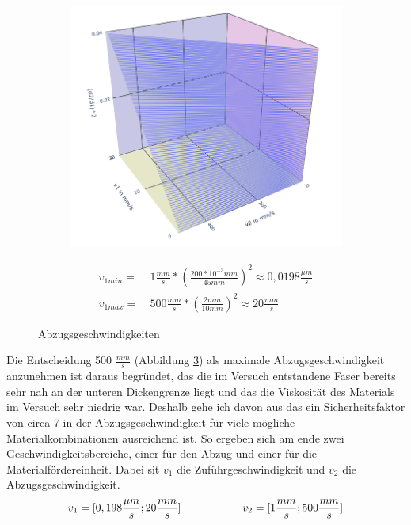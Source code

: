 \begin{figure}[!h]
     \centering
     \begin{subfigure}[]{0.4\textwidth}
         \centering
         \includegraphics[width=\textwidth]{Abbildungen/v1_v2_d_wirframe_2 (2).png}
         
         \label{fig:abzug_speed}
     \end{subfigure}
     \hspace{0mm}
     \begin{subfigure}[]{0.2\textwidth}
         \begin{align*}
             v_{1min} = &  \ 1 \frac{mm}{s} * (\frac{200*10^{-3}mm}{45mm})^2 \approx 0,0198 \frac{\mu m}{s}\\      
             v_{1max} = &  \ 500  \frac{mm}{s} * (\frac{2mm}{10mm})^2 \approx 20 \frac{mm}{s}
         \end{align*}
         
         \label{fig:abzug_min_max}
     \end{subfigure}
     \caption{Abzugsgeschwindigkeiten}
      \label{fig:abzugsgeschwindigkeit}
\end{figure}

Die Entscheidung 500 $\frac{mm}{s}$ (Abbildung \ref{fig:abzugsgeschwindigkeit}) als maximale Abzugsgeschwindigkeit anzunehmen ist daraus begründet, das die im Versuch entstandene Faser bereits sehr nah an der unteren Dickengrenze liegt und das die Viskosität des Materials im Versuch sehr niedrig war. Deshalb gehe ich davon aus das ein Sicherheitsfaktor von circa 7 in der Abzugsgeschwindigkeit für viele mögliche Materialkombinationen ausreichend ist. 
So ergeben sich am ende zwei Geschwindigkeitsbereiche, einer für den Abzug und einer für die Materialfördereinheit. Dabei sit $v_1$ die Zuführgeschwindigkeit und $v_2$ die Abzugsgeschwindigkeit.
\begin{equation*}
    v_1 = [0,198\frac{\mu m}{s}; 20 \frac{mm}{s}] \hspace{20mm} v_2 = [1\frac{mm}{s};500\frac{mm}{s}]
\end{equation*}
         

 \newpage